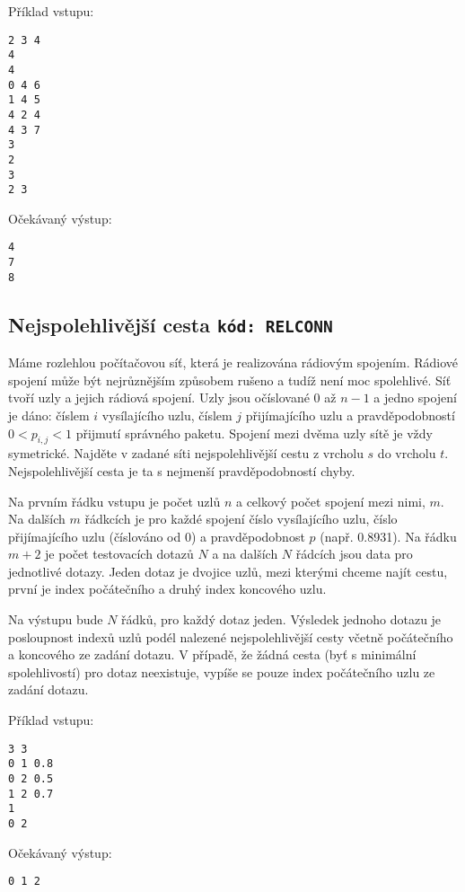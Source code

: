 \documentclass[a4paper,10pt]{article}
\begin{document}
Příklad vstupu:
\begin{verbatim}
2 3 4
4
4
0 4 6
1 4 5
4 2 4
4 3 7
3
2
3
2 3
\end{verbatim}

Očekávaný výstup:
\begin{verbatim}
4
7
8
\end{verbatim}


\subsection{Nejspolehlivější cesta \hfill{\tt kód: RELCONN}}
Máme rozlehlou počítačovou síť, která je realizována
rádiovým spojením. Rádiové spojení může být nejrůznějším způsobem rušeno a tudíž
není moc spolehlivé. 
Síť tvoří uzly a jejich rádiová spojení. Uzly jsou očíslované $0$ až $n-1$ a jedno spojení je 
dáno: číslem $i$ vysílajícího uzlu, číslem $j$ přijímajícího uzlu a pravděpodobností $0<p_{i,j}<1$ přijmutí správného paketu.
Spojení mezi dvěma uzly sítě je vždy symetrické. 
Najděte v zadané síti nejspolehlivější cestu z vrcholu $s$ do vrcholu $t$. Nejspolehlivější
cesta je ta s nejmenší pravděpodobností chyby.

Na prvním řádku vstupu je počet uzlů $n$ a celkový počet spojení mezi nimi, $m$.
Na dalších $m$ řádkcích je pro každé spojení číslo vysílajícího uzlu, číslo  přijímajícího uzlu (číslováno od 0) a pravděpodobnost $p$ (např. 0.8931).
Na řádku $m+2$ je počet testovacích dotazů $N$ a na dalších $N$ řádcích jsou data pro jednotlivé dotazy. 
Jeden dotaz je dvojice uzlů, mezi kterými chceme najít cestu, první je index počátečního a druhý index koncového uzlu.

Na výstupu bude $N$ řádků, pro každý dotaz jeden. 
Výsledek jednoho dotazu je posloupnost indexů uzlů podél nalezené nejspolehlivější cesty včetně počátečního a koncového ze zadání dotazu.
V případě, že žádná cesta (byť s minimální spolehlivostí) pro dotaz neexistuje, vypíše se pouze index počátečního uzlu ze zadání dotazu.

Příklad vstupu:
\begin{verbatim}
3 3
0 1 0.8
0 2 0.5
1 2 0.7
1
0 2
\end{verbatim}

Očekávaný výstup:
\begin{verbatim}
0 1 2
\end{verbatim}
\end{document}

